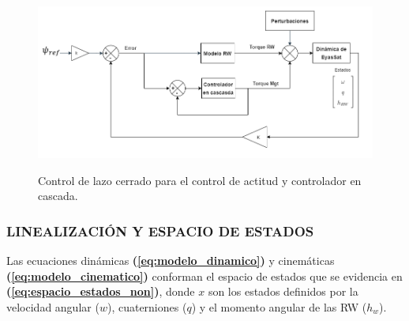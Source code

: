 \begin{itemize}
	 \begin{figure}[!ht]
	 	\begin{center}
	 		\includegraphics[scale=0.55]{imagenes/controladores/Diagrama_controlador2.PNG}\\
	 	\end{center}
	 	\caption{Control de lazo cerrado para el control de actitud y controlador en cascada.}
	 	\label{fig:desaturacionDiagrama2}	 	
	 \end{figure} 	  
\end{itemize}



\subsubsection{LINEALIZACIÓN Y ESPACIO DE ESTADOS}
\hfill \break
Las ecuaciones dinámicas \textbf{(\ref{eq:modelo_dinamico})} y cinemáticas \textbf{(\ref{eq:modelo_cinematico})} conforman el espacio de estados que se evidencia en 
\textbf{(\ref{eq:espacio_estados_non})}, donde $x$ son los estados definidos por la velocidad angular ($w$), cuaterniones ($q$) y el momento angular de las RW ($h_w$). 

